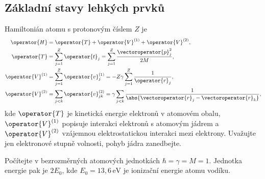 \subsection{Základní stavy lehkých prvků}
Hamiltonián atomu s protonovým číslem $Z$ je
\begin{subequations}
    \begin{align}
        \operator{H}&=\operator{T}+\operator{V}^{(1)}+\operator{V}^{(2)},\\
        \operator{T}&=\sum_{j=1}^{Z}\operator{t}_{j}=\sum_{j=1}^{Z}\frac{\vectoroperator{p}_{j}^{2}}{2M},\\
        \operator{V}^{(1)}&=\sum_{j=1}^{Z}\operator{v}^{(1)}_{j}=-Z\gamma\sum_{j=1}^{Z}\frac{1}{\operator{r}_{j}},\\
        \operator{V}^{(2)}&=\sum_{j<k}\operator{v}^{(2)}_{jk}=\gamma\sum_{j<k}\frac{1}{\abs{\vectoroperator{r}_{j}-\vectoroperator{r}_{k}}},
    \end{align}        
\end{subequations}
kde $\operator{T}$ je kinetická energie elektronů v atomovém obalu, $\operator{V}^{(1)}$ popisuje interakci elektronů s atomovým jádrem a $\operator{V}^{(2)}$ vzájemnou elektrostatickou interakci mezi elektrony.
Uvažujte jen elektronové stupně volnosti, pohyb jádra zanedbejte.

Počítejte v bezrozměrných atomových jednotkách $\hbar=\gamma=M=1$.
Jednotka energie pak je $2E_{0}$, kde $E_{0}=13,\!6\,\mathrm{eV}$ je ionizační energie atomu vodíku.

